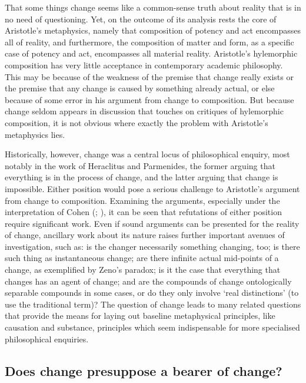 That some things change seems like a common-sense truth about reality that is in no need of questioning. Yet, on the outcome of its analysis rests the core of Aristotle's metaphysics, namely that composition of potency and act encompasses all of reality, and furthermore, the composition of matter and form, as a specific case of potency and act, encompasses all material reality.
Aristotle's hylemorphic composition has very little acceptance in contemporary academic philosophy. This may be because of the weakness of the premise that change really exists or the premise that any change is caused by something already actual, or else because of some error in his argument from change to composition. But because change seldom appears in discussion that touches on critiques of hylemorphic composition, it is not obvious where exactly the problem with Aristotle's metaphysics lies.

Historically, however, change was a central locus of philosophical enquiry, most notably in the work of Heraclitus and Parmenides, the former arguing that everything is in the process of change, and the latter arguing that change is impossible. Either position would pose a serious challenge to Aristotle's argument from change to composition. Examining the arguments, especially under the interpretation of Cohen (\citeyear[][]{cohen-heracli}; \citeyear[][]{cohen-parm1}), it can be seen that refutations of either position require significant work. Even if sound arguments can be presented for the reality of change, ancillary work about its nature raises further important avenues of investigation, such as: is the changer necessarily something changing, too;
\parencite[][17-68]{feser2017five}
is there such thing as instantaneous change;
\parencite[][]{Oderberg2006-ODEICW-2}
are there infinite actual mid-points of a change, as exemplified by Zeno's paradox; is it the case that everything that changes has an agent of change;
\parencite[][]{Oderberg2010-ODEWIC}
and are the compounds of change ontologically separable compounds in some cases, or do they only involve `real distinctions' (to use the traditional term)? The question of change leads to many related questions that provide the means for laying out baseline metaphysical principles, like causation and substance, principles which seem indispensable for more specialised philosophical enquiries.

\subsection{Does change presuppose a bearer of change?}

